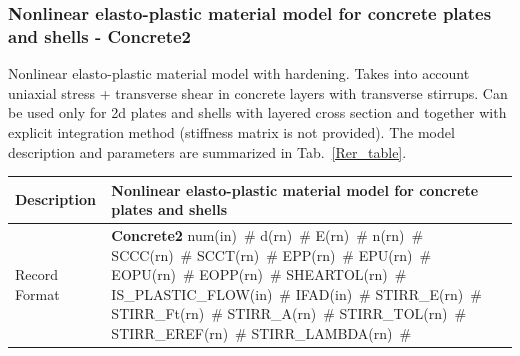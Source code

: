 \documentclass[a4paper]{article}
\newcommand{\descitem}[1]{{\noindent \bf #1}}
\newcommand{\elemparam}[2]{{{#1\tiny (#2)}~\#}}
\begin{document}
\subsubsection{Nonlinear elasto-plastic material model for concrete
plates and shells - Concrete2}
\label{Rer}
Nonlinear elasto-plastic material model with hardening.
Takes into account uniaxial stress + transverse shear in concrete
layers with transverse stirrups.
Can be used only for 2d plates and shells with layered cross section
and together with explicit integration method (stiffness matrix is not
provided).
The model description and parameters are summarized
in Tab.~\ref{Rer_table}.

\begin{table}[!htb]
\begin{tabular}{|l|p{9cm}|}
\hline
Description & Nonlinear elasto-plastic material model for concrete
plates and shells\\
\hline
Record Format & \descitem{Concrete2} \elemparam{num}{in}
\elemparam{d}{rn} \elemparam{E}{rn} \elemparam{n}{rn}
\elemparam{SCCC}{rn} \elemparam{SCCT}{rn} \elemparam{EPP}{rn} \elemparam{EPU}{rn}
\elemparam{EOPU}{rn} \elemparam{EOPP}{rn} \elemparam{SHEARTOL}{rn}
\elemparam{IS\_PLASTIC\_FLOW}{in} \elemparam{IFAD}{in} \elemparam{STIRR\_E}{rn} \elemparam{STIRR\_Ft}{rn}
\elemparam{STIRR\_A}{rn} \elemparam{STIRR\_TOL}{rn} \elemparam{STIRR\_EREF}{rn}
\elemparam{STIRR\_LAMBDA}{rn}\\


\end{tabular}
\end{table}
\end{document}
